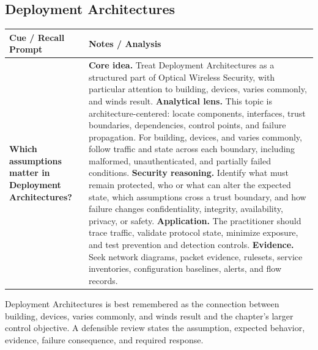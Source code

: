 \documentclass[11pt]{article}
\newcommand{\CornellHeader}{%
\rowcolor{Navy}\color{white}\bfseries Cue / Recall Prompt & \color{white}\bfseries Notes / Analysis\\\hline}
\newcommand{\CornellRow}[2]{%
\cellcolor{CueGray}\RaggedRight\textbf{#1} & \RaggedRight #2\\\hline}
\begin{document}
\subsection*{Deployment Architectures}
\begin{longtable}{>{\RaggedRight\arraybackslash}p{}|>{\RaggedRight\arraybackslash}p{}}
\CornellHeader
\CornellRow{Which assumptions matter in Deployment Architectures?}{\textbf{Core idea.} Treat Deployment Architectures as a structured part of Optical Wireless Security, with particular attention to building, devices, varies commonly, and winds result. \textbf{Analytical lens.} This topic is architecture-centered: locate components, interfaces, trust boundaries, dependencies, control points, and failure propagation. For building, devices, and varies commonly, follow traffic and state across each boundary, including malformed, unauthenticated, and partially failed conditions. \textbf{Security reasoning.} Identify what must remain protected, who or what can alter the expected state, which assumptions cross a trust boundary, and how failure changes confidentiality, integrity, availability, privacy, or safety. \textbf{Application.} The practitioner should trace traffic, validate protocol state, minimize exposure, and test prevention and detection controls. \textbf{Evidence.} Seek network diagrams, packet evidence, rulesets, service inventories, configuration baselines, alerts, and flow records.}
\end{longtable}
\begin{topicsummary}
Deployment Architectures is best remembered as the connection between building, devices, varies commonly, and winds result and the chapter's larger control objective. A defensible review states the assumption, expected behavior, evidence, failure consequence, and required response.
\end{topicsummary}
\end{document}
